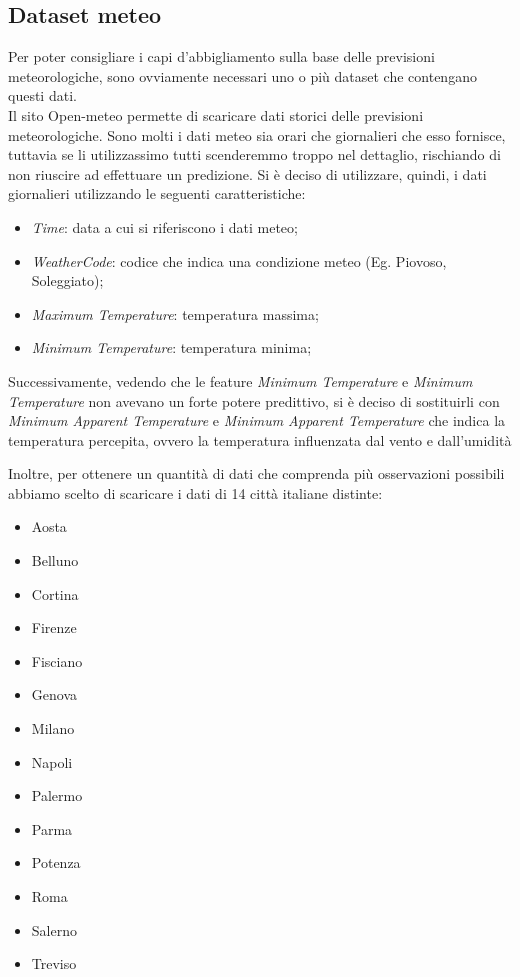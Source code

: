 \documentclass[a4paper, 11pt, oneside]{report}
\begin{document}
                \subsection{Dataset meteo}
                Per poter consigliare i capi d'abbigliamento sulla base delle previsioni meteorologiche, sono ovviamente necessari
                uno o più dataset che contengano questi dati.\\
                Il sito Open-meteo \cite{9} permette di scaricare dati storici delle previsioni meteorologiche.
                Sono molti i dati meteo sia orari che giornalieri che esso fornisce, tuttavia se li utilizzassimo tutti
                scenderemmo troppo nel dettaglio, rischiando di non riuscire ad effettuare un predizione.
                Si è deciso di utilizzare, quindi, i dati giornalieri utilizzando le seguenti caratteristiche:
                \begin{itemize}
                    \item \emph{Time}: data a cui si riferiscono i dati meteo;
                    \item \emph{WeatherCode}: codice che indica una condizione meteo (Eg. Piovoso, Soleggiato);
                    \item \emph{Maximum Temperature}: temperatura massima;
                    \item \emph{Minimum Temperature}: temperatura minima;
                \end{itemize}
                Successivamente, vedendo che le feature \emph{Minimum Temperature} e \emph{Minimum Temperature} non avevano un
                forte potere predittivo, si è deciso di sostituirli con \emph{Minimum Apparent Temperature}
                e \emph{Minimum Apparent Temperature} che indica la temperatura percepita, ovvero la temperatura influenzata dal vento e dall'umidità
                \\
                \par \noindent Inoltre, per ottenere un quantità di dati che comprenda più osservazioni possibili abbiamo scelto di scaricare i dati di
                14 città italiane distinte:
                \begin{itemize}
                    \item Aosta
                    \item Belluno
                    \item Cortina
                    \item Firenze
                    \item Fisciano
                    \item Genova
                    \item Milano
                    \item Napoli
                    \item Palermo
                    \item Parma
                    \item Potenza
                    \item Roma
                    \item Salerno
                    \item Treviso
                \end{itemize}
\end{document}

